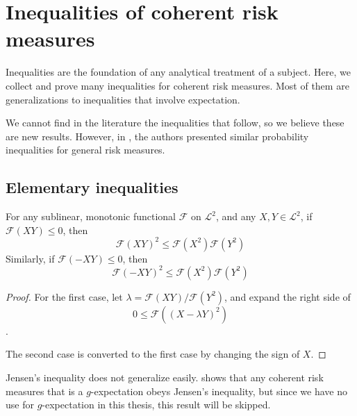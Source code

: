 
\chapter{Inequalities of coherent risk measures}
\label{chapter_inequalities}

Inequalities are the foundation of any analytical treatment of a subject. Here, we collect and prove many inequalities for coherent risk measures. Most of them are generalizations to inequalities that involve expectation.

We cannot find in the literature the inequalities that follow, so we believe these are new results. However, in \cite[Chapter 3]{zabarankinStatisticalDecisionProblems2016}, the authors presented similar probability inequalities for general risk measures.

\section{Elementary inequalities}\label{sec:elementary_inequalities}
\begin{prop}
For any sublinear, monotonic functional $\mathcal{F}$ on $\mathscr{L}^2$, and any $X, Y\in \mathscr{L}^2$, if $\mathcal{F}(XY) \le 0$, then 
\begin{equation}
\label{eq:csineq_crm}
\mathcal{F}(XY)^2 \le \mathcal{F}(X^2)\mathcal{F}(Y^2)
\end{equation}
Similarly, if $\mathcal{F}(-XY)\le 0$, then 
\begin{equation}
\label{eq:csineq_crm_2}
\mathcal{F}(-XY)^2 \le \mathcal{F}(X^2)\mathcal{F}(Y^2)
\end{equation}
\end{prop}
\begin{proof}
For the first case, let $\lambda =\mathcal{F}(XY)/\mathcal{F}(Y^2)$, and expand the right side of 
$$0\le \mathcal{F}((X-\lambda Y)^2)$$. 

The second case is converted to the first case by changing the sign of $X$.
\end{proof}

Jensen's inequality does not generalize easily. \cite[Theorem 3]{chenRiskMeasuresNonlinear2013} shows that any coherent risk measures that is a $g$-expectation obeys Jensen's inequality, but since we have no use for $g$-expectation in this thesis, this result will be skipped.

